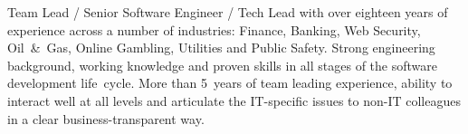 \documentclass{res}
\newcommand{\osection}[1]{\section{\sc {\Large \textbf{#1}\\}} \vspace{0.30cm}}
\begin{document}
\begin{resume}

\indent Team Lead / Senior Software Engineer / Tech Lead with over eighteen years of experience
across a number of industries: Finance, Banking, Web Security, Oil~\&~Gas, Online Gambling, Utilities and Public Safety. Strong engineering background, working knowledge and proven skills in all stages of the software development life~cycle. More than 5~years of team leading experience, ability to interact well at all levels and articulate the IT-specific issues to non-IT colleagues in a clear business-transparent way.


\end{resume}
\end{document}
